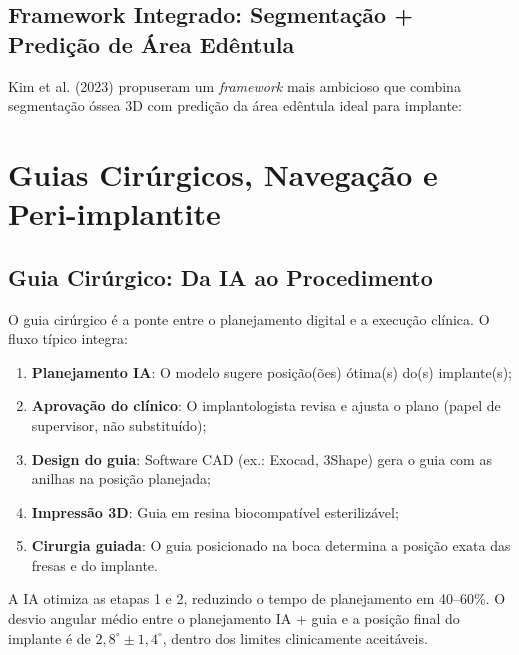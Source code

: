 \subsection{Framework Integrado: Segmentação + Predição de Área Edêntula}

Kim et al. (2023) propuseram um \textit{framework} mais ambicioso que combina segmentação óssea 3D com predição da área edêntula ideal para implante:


\section{Guias Cirúrgicos, Navegação e Peri-implantite}

\subsection{Guia Cirúrgico: Da IA ao Procedimento}

O guia cirúrgico é a ponte entre o planejamento digital e a execução clínica. O fluxo típico integra:
\begin{enumerate}
    \item \textbf{Planejamento IA}: O modelo sugere posição(ões) ótima(s) do(s) implante(s);
    \item \textbf{Aprovação do clínico}: O implantologista revisa e ajusta o plano (papel de supervisor, não substituído);
    \item \textbf{Design do guia}: Software CAD (ex.: Exocad, 3Shape) gera o guia com as anilhas na posição planejada;
    \item \textbf{Impressão 3D}: Guia em resina biocompatível esterilizável;
    \item \textbf{Cirurgia guiada}: O guia posicionado na boca determina a posição exata das fresas e do implante.
\end{enumerate}

A IA otimiza as etapas 1 e 2, reduzindo o tempo de planejamento em 40--60\%. O desvio angular médio entre o planejamento IA + guia e a posição final do implante é de $2,8^\circ \pm 1,4^\circ$, dentro dos limites clinicamente aceitáveis.

